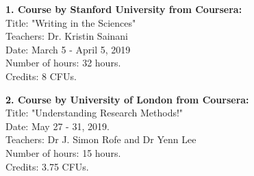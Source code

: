 \textbf{1. Course by Stanford University from Coursera: }\\
Title: "Writing in the Sciences"\\
Teachers: Dr. Kristin Sainani \\
Date: March 5 - April 5, 2019 \\
Number of hours: 32 hours.\\ 
Credits: 8 CFUs.

\textbf{2. Course by University of London from Coursera:}\\
Title: "Understanding Research Methods!"\\
Date:  May 27 - 31, 2019.\\
Teachers:  Dr J. Simon Rofe and  Dr Yenn Lee \\
Number of hours: 15 hours.\\ 
Credits: 3.75 CFUs.